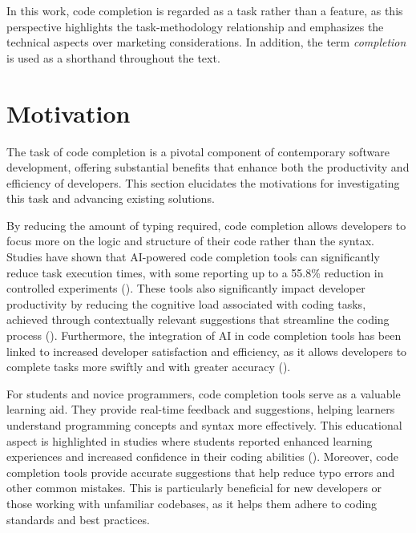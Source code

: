 In this work, code completion is regarded as a task rather than a feature, as this perspective highlights the task-methodology relationship and emphasizes the technical aspects over marketing considerations. In addition, the term \textit{completion} is used as a shorthand throughout the text.


\section{Motivation}

The task of code completion is a pivotal component of contemporary software development, offering substantial benefits that enhance both the productivity and efficiency of developers. This section elucidates the motivations for investigating this task and advancing existing solutions.

By reducing the amount of typing required, code completion allows developers to focus more on the logic and structure of their code rather than the syntax. Studies have shown that AI-powered code completion tools can significantly reduce task execution times, with some reporting up to a 55.8\% reduction in controlled experiments (\cite{peng2023}). These tools also significantly impact developer productivity by reducing the cognitive load associated with coding tasks, achieved through contextually relevant suggestions that streamline the coding process (\cite{weber2024}). Furthermore, the integration of AI in code completion tools has been linked to increased developer satisfaction and efficiency, as it allows developers to complete tasks more swiftly and with greater accuracy (\cite{bakal2025}).

For students and novice programmers, code completion tools serve as a valuable learning aid. They provide real-time feedback and suggestions, helping learners understand programming concepts and syntax more effectively. This educational aspect is highlighted in studies where students reported enhanced learning experiences and increased confidence in their coding abilities (\cite{takerngsaksiri2024}). Moreover, code completion tools provide accurate suggestions that help reduce typo errors and other common mistakes. This is particularly beneficial for new developers or those working with unfamiliar codebases, as it helps them adhere to coding standards and best practices.

